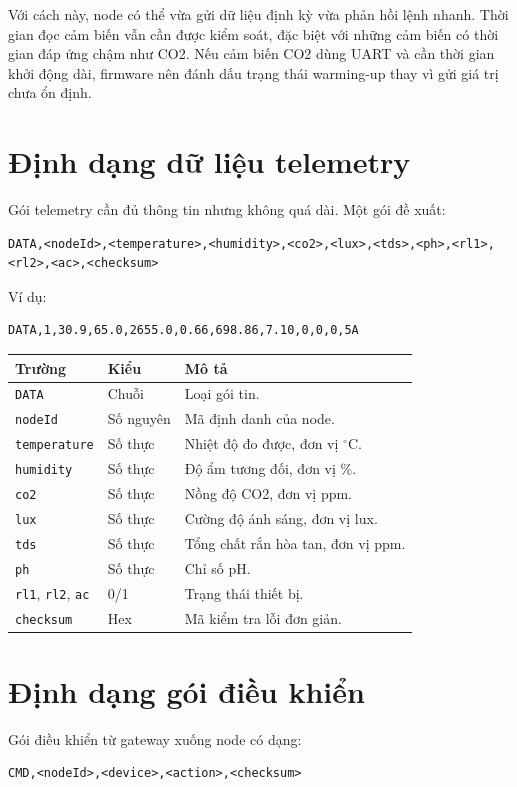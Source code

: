 Với cách này, node có thể vừa gửi dữ liệu định kỳ vừa phản hồi lệnh nhanh. Thời gian đọc cảm biến vẫn cần được kiểm soát, đặc biệt với những cảm biến có thời gian đáp ứng chậm như CO2. Nếu cảm biến CO2 dùng UART và cần thời gian khởi động dài, firmware nên đánh dấu trạng thái warming-up thay vì gửi giá trị chưa ổn định.

\section{Định dạng dữ liệu telemetry}
Gói telemetry cần đủ thông tin nhưng không quá dài. Một gói đề xuất:

\begin{lstlisting}[caption={Định dạng gói telemetry}]
DATA,<nodeId>,<temperature>,<humidity>,<co2>,<lux>,<tds>,<ph>,<rl1>,<rl2>,<ac>,<checksum>
\end{lstlisting}

Ví dụ:
\begin{lstlisting}
DATA,1,30.9,65.0,2655.0,0.66,698.86,7.10,0,0,0,5A
\end{lstlisting}

\begin{longtable}{|p{2.8cm}|p{3cm}|p{7.1cm}|}
\hline
\textbf{Trường} & \textbf{Kiểu} & \textbf{Mô tả} \\
\hline
\texttt{DATA} & Chuỗi & Loại gói tin. \\
\hline
\texttt{nodeId} & Số nguyên & Mã định danh của node. \\
\hline
\texttt{temperature} & Số thực & Nhiệt độ đo được, đơn vị $^\circ$C. \\
\hline
\texttt{humidity} & Số thực & Độ ẩm tương đối, đơn vị \%. \\
\hline
\texttt{co2} & Số thực & Nồng độ CO2, đơn vị ppm. \\
\hline
\texttt{lux} & Số thực & Cường độ ánh sáng, đơn vị lux. \\
\hline
\texttt{tds} & Số thực & Tổng chất rắn hòa tan, đơn vị ppm. \\
\hline
\texttt{ph} & Số thực & Chỉ số pH. \\
\hline
\texttt{rl1}, \texttt{rl2}, \texttt{ac} & 0/1 & Trạng thái thiết bị. \\
\hline
\texttt{checksum} & Hex & Mã kiểm tra lỗi đơn giản. \\
\hline
\end{longtable}

\section{Định dạng gói điều khiển}
Gói điều khiển từ gateway xuống node có dạng:
\begin{lstlisting}
CMD,<nodeId>,<device>,<action>,<checksum>
\end{lstlisting}

